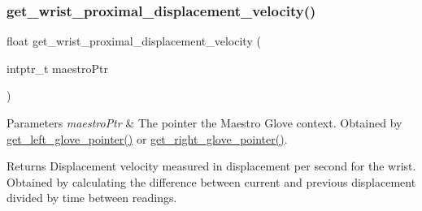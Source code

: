 \subsubsection{\texorpdfstring{get\+\_\+wrist\+\_\+proximal\+\_\+displacement\+\_\+velocity()}{get\_wrist\_proximal\_displacement\_velocity()}}
{\footnotesize\ttfamily float get\+\_\+wrist\+\_\+proximal\+\_\+displacement\+\_\+velocity (\begin{DoxyParamCaption}\item[{intptr\+\_\+t}]{maestro\+Ptr }\end{DoxyParamCaption})}


\begin{DoxyParams}{Parameters}
{\em maestro\+Ptr} & The pointer the Maestro Glove context. Obtained by \hyperlink{group__glove_management_ga63ce3c99d4a8b8db851b22af9185764e}{get\+\_\+left\+\_\+glove\+\_\+pointer()} or \hyperlink{group__glove_management_ga9b8fd9d91aeac3f8da50f7a7eba0c32b}{get\+\_\+right\+\_\+glove\+\_\+pointer()}. \\
\hline
\end{DoxyParams}
\begin{DoxyReturn}{Returns}
Displacement velocity measured in displacement per second for the wrist. Obtained by calculating the difference between current and previous displacement divided by time between readings. 
\end{DoxyReturn}
